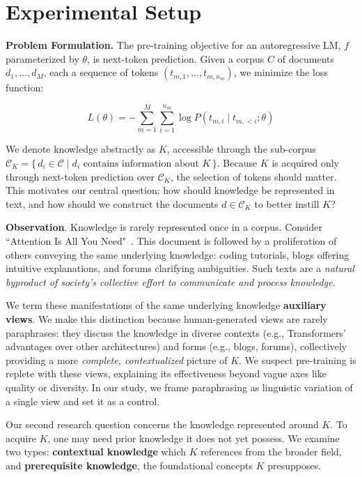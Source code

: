 \documentclass[11pt]{article}
\begin{document}
\section{Experimental Setup}
\label{experiment}
 
\textbf{Problem Formulation.}
The pre-training objective for an autoregressive LM, $f$ parameterized by $\theta$, is next-token prediction. 
Given a corpus $C$ of documents ${d_1,\dots,d_M}$, each a sequence of tokens $(t_{m,1}, \dots, t_{m,n_m})$,
we minimize the loss function:

\begin{equation}
L(\theta) = -\sum_{m=1}^{M} \sum_{i=1}^{n_m} \log P(t_{m,i} \mid t_{m,<i}; \theta)
\end{equation}

We denote knowledge abstractly as $K$, accessible through the sub-corpus $\mathcal{C}_K = \{\, d_i \in \mathcal{C} \mid d_i \text{ contains information about } K \,\}$. Because $K$ is acquired only through next-token prediction over $\mathcal{C}_K$, the selection of tokens should matter. This motivates our central question: how should knowledge be represented in text, and how should we construct the documents $d \in \mathcal{C}_K$ to better instill $K$?


\textbf{Observation}. Knowledge is rarely represented once in a corpus. Consider ``Attention Is All You Need"~\citep{vaswani2017attention}. This document is followed by a proliferation of others conveying the same underlying knowledge: coding tutorials, blogs offering intuitive explanations, and forums clarifying ambiguities. Such texts are a \textit{natural byproduct of society's collective effort to communicate and process knowledge}.

We term these manifestations of the same underlying knowledge \textbf{auxiliary views}. We make this distinction because human-generated views are rarely paraphrases: they discuss the knowledge in diverse contexts (e.g., Transformers' advantages over other architectures) and forms (e.g., blogs, forums), collectively providing a more \textit{complete, contextualized} picture of $K$. We suspect pre-training is replete with these views, explaining its effectiveness beyond vague axes like quality or diversity. In our study, we frame paraphrasing as linguistic variation of a single view and set it as a control.

Our second research question concerns the knowledge represented around $K$. To acquire $K$, one may need prior knowledge it does not yet possess. We examine two types: \textbf{contextual knowledge} which $K$ references from the broader field, and \textbf{prerequisite knowledge}, the foundational concepts $K$ presupposes.
\end{document}
